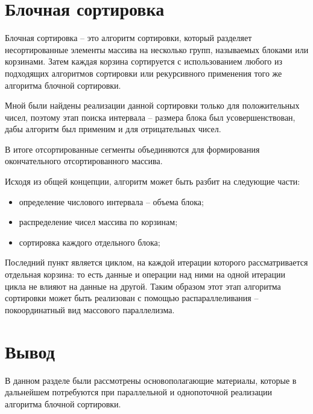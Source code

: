 \section{Блочная сортировка}

Блочная сортировка \cite{bucket} -- это алгоритм сортировки, который разделяет несортированные элементы массива на несколько групп, называемых блоками или корзинами. Затем каждая корзина сортируется с использованием любого из подходящих алгоритмов сортировки или рекурсивного применения того же алгоритма блочной сортировки. 

Мной были найдены реализации данной сортировки только для положительных чисел, поэтому этап поиска интервала -- размера блока был усовершенствован, дабы алгоритм был применим и для отрицательных чисел. 

В итоге отсортированные сегменты объединяются для формирования окончательного отсортированного массива.

Исходя из общей концепции, алгоритм может быть разбит на следующие части: 
\begin{itemize}
	\item определение числового интервала -- объема блока;
	\item распределение чисел массива по корзинам;
	\item сортировка каждого отдельного блока;
\end{itemize}

Последний пункт является циклом, на каждой итерации которого рассматривается отдельная корзина: то есть данные и операции над ними на одной итерации цикла не влияют на данные на другой. Таким образом этот этап алгоритма сортировки может быть реализован с помощью распараллеливания -- покоординатный вид массового параллелизма. 

\section{Вывод}

В данном разделе были рассмотрены основополагающие материалы, которые в дальнейшем потребуются при параллельной и однопоточной реализации алгоритма блочной сортировки.

